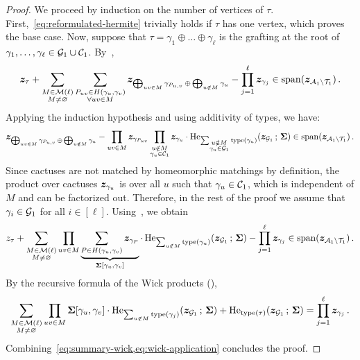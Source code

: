\begin{proof}
    We proceed by induction on the number
    of vertices of $\tau$. First,~\cref{eq:reformulated-hermite} trivially holds
    if $\tau$ has one vertex, which proves
    the base case.
    Now, suppose that $\tau = \gamma_1\oplus \ldots \oplus \gamma_\ell$ is the
    grafting at the root of $\gamma_1,\ldots,\gamma_{\ell}\in{\cal G}_1\cup {\cal C}_1$.
    By~,
    \begin{align*}
        {\bm z}_\tau + \sum_{\substack{M\in {\cal M}(\ell)\\M\neq \varnothing}} \sum_{\substack{P_{uv}\in H(\gamma_u,\gamma_v)\\\forall uv\in M}} {\bm z}_{\bigoplus_{uv\in M}\gamma_{P_{u,v}} \,\oplus\, \bigoplus_{u\notin M} \gamma_u} - \prod_{j=1}^\ell {\bm z}_{\gamma_j}\in \operatorname{span}({\bm z}_{{\cal A}_1\setminus {\cal T}_1})\,.
    \end{align*}
    Applying the induction hypothesis and
    using additivity of types, we have:
    \begin{align*}
        {\bm z}_{\bigoplus_{uv\in M}\gamma_{P_{u,v}} \,\oplus\, \bigoplus_{u\notin M} \gamma_u} - \prod_{uv\in M} {\bm z}_{\gamma_{P_{uv}}} \prod_{\substack{u\notin M\\\gamma_u\in {\cal C}_1}} {\bm z}_{\gamma_u} \cdot \operatorname{He}_{\sum_{\substack{u\notin M\\\gamma_u\in{\cal G}_1}} \operatorname{type}(\gamma_u)}({\bm z}_{{\cal G}_1}\,;\,\bm \Sigma)\in \operatorname{span}({\bm z}_{{\cal A}_1\setminus {\cal T}_1})\,.
    \end{align*}
    Since cactuses are not matched
    by homeomorphic matchings by
    definition, the
    product over cactuses ${\bm z}_{\gamma_u}$ is over all
    $u$ such that $\gamma_u\in {\cal C}_1$, which is independent of $M$ and can be 
    factorized out. Therefore,
    in the rest of the proof
    we assume that $\gamma_i\in {\cal G}_1$ for all $i\in [\ell]$.
    Using~,
    we obtain
    \begin{equation}
         z_\tau + \sum_{\substack{M\in {\cal M}(\ell)\\M\neq \varnothing}} \prod_{uv\in M} \underbrace{\sum_{P\in H(\gamma_u,\gamma_v)} {\bm z}_{\gamma_P}}_{\bm \Sigma[\gamma_u,\gamma_v]} \cdot  \operatorname{He}_{\sum_{u\notin M} \operatorname{type}(\gamma_u)} ({\bm z}_{{\cal G}_1}\,;\, \bm \Sigma) - \prod_{j=1}^\ell {\bm z}_{\gamma_j}\in \operatorname{span}({\bm z}_{{\cal A}_1\setminus {\cal T}_1})\,.\label{eq:summary-wick}
    \end{equation}
    By the recursive formula of the
    Wick products (),
    \begin{equation}
        \sum_{\substack{M\in {\cal M}(\ell)\\M\neq \varnothing}} \prod_{uv\in M} \bm \Sigma[\gamma_u,\gamma_v] \cdot  \operatorname{He}_{\sum_{u\notin M} \operatorname{type}(\gamma_j)} ({\bm z}_{{\cal G}_1}\,;\, \bm \Sigma) + \operatorname{He}_{\operatorname{type}(\tau)}({\bm z}_{{\cal G}_1}\,;\,\bm \Sigma)  = 
         \prod_{j=1}^\ell {\bm z}_{\gamma_j}\,.\label{eq:wick-application}
    \end{equation}
    Combining~\cref{eq:summary-wick,eq:wick-application} concludes the proof.
\end{proof}

